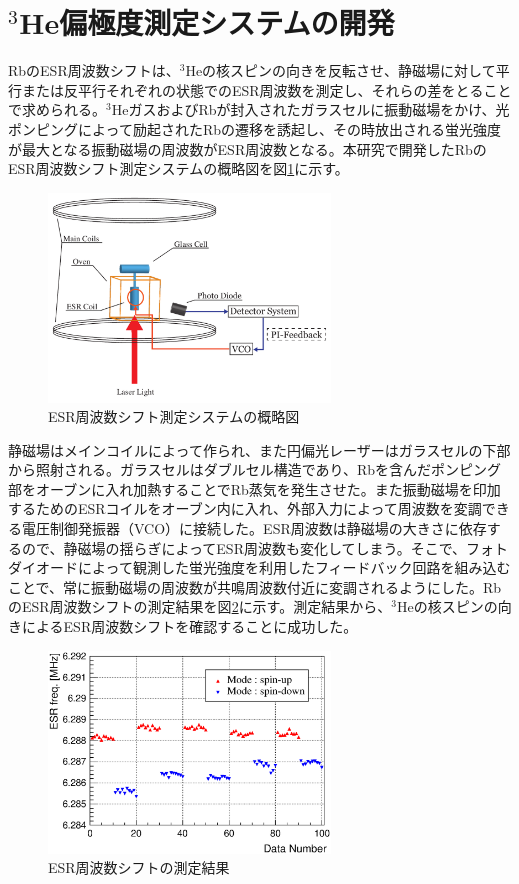 \documentclass[twocolumn,11pt,uplatex]{jsarticle}
\begin{document}
\section{$^3$He偏極度測定システムの開発}
RbのESR周波数シフトは、$^3$Heの核スピンの向きを反転させ、静磁場に対して平行または反平行それぞれの状態でのESR周波数を測定し、それらの差をとることで求められる。$^3$HeガスおよびRbが封入されたガラスセルに振動磁場をかけ、光ポンピングによって励起されたRbの遷移を誘起し、その時放出される蛍光強度が最大となる振動磁場の周波数がESR周波数となる。本研究で開発したRbのESR周波数シフト測定システムの概略図を図\ref{ESR_setup}に示す。
%
 \begin{figure}[htbp]
  \centering
   \includegraphics[width=7.5cm]{ESR_setup_abst.pdf}
   \caption{ESR周波数シフト測定システムの概略図}
   \label{ESR_setup}
 \end{figure}
%
静磁場はメインコイルによって作られ、また円偏光レーザーはガラスセルの下部から照射される。ガラスセルはダブルセル構造であり、Rbを含んだポンピング部をオーブンに入れ加熱することでRb蒸気を発生させた。また振動磁場を印加するためのESRコイルをオーブン内に入れ、外部入力によって周波数を変調できる電圧制御発振器（VCO）に接続した。ESR周波数は静磁場の大きさに依存するので、静磁場の揺らぎによってESR周波数も変化してしまう。そこで、フォトダイオードによって観測した蛍光強度を利用したフィードバック回路を組み込むことで、常に振動磁場の周波数が共鳴周波数付近に変調されるようにした。RbのESR周波数シフトの測定結果を図\ref{ESRshift}に示す。測定結果から、$^3$Heの核スピンの向きによるESR周波数シフトを確認することに成功した。

 \begin{figure}[tbp]
  \centering
   \includegraphics[width=7.5cm]{ESRfreq_ave_abst.eps}
   \caption{ESR周波数シフトの測定結果}
   \label{ESRshift}
 \end{figure}
\end{document}
